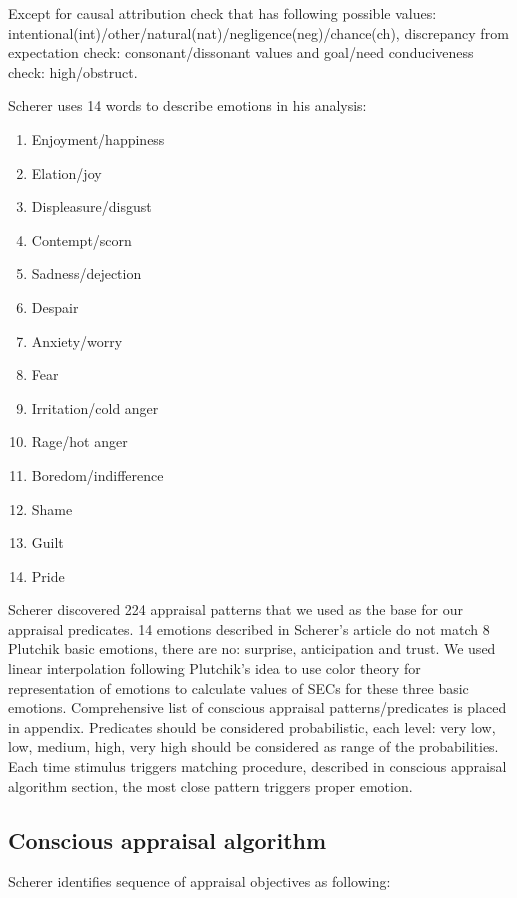 Except for causal attribution check that has following possible values: intentional(int)/other/natural(nat)/negligence(neg)/chance(ch),  discrepancy from expectation check: consonant/dissonant values and goal/need conduciveness check: high/obstruct.

Scherer uses 14 words to describe emotions in his analysis:

\begin{enumerate}
	\item  Enjoyment/happiness
	\item  Elation/joy
	\item  Displeasure/disgust
	\item  Contempt/scorn
	\item  Sadness/dejection
	\item  Despair
	\item  Anxiety/worry
	\item  Fear
	\item  Irritation/cold anger
	\item  Rage/hot anger
	\item  Boredom/indifference
	\item  Shame
	\item  Guilt
	\item  Pride
\end{enumerate}

Scherer discovered 224 appraisal patterns that we used as the base for our appraisal predicates. 14 emotions described in Scherer's article do not match 8 Plutchik basic emotions, there are no: surprise, anticipation and trust. We used linear interpolation following Plutchik's idea to use color theory for representation of emotions to calculate values of SECs for these three basic emotions. Comprehensive list of conscious appraisal patterns/predicates is placed in appendix. Predicates should be considered probabilistic, each level: very low, low, medium, high, very high should be considered as range of the probabilities. Each time stimulus triggers matching procedure, described in conscious appraisal algorithm section, the most close pattern triggers proper emotion.

\subsection{Conscious appraisal algorithm}

Scherer identifies \cite{appraisal_considered_as_a_process} sequence of appraisal objectives as following:

